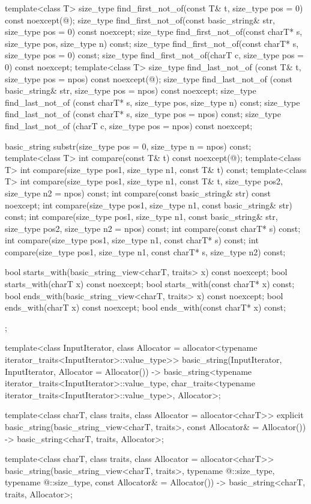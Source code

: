 \begin{codeblock}
{{    template<class T>
      size_type find_first_not_of(const T& t, size_type pos = 0) const noexcept(@\seebelow@);
    size_type find_first_not_of(const basic_string& str, size_type pos = 0) const noexcept;
    size_type find_first_not_of(const charT* s, size_type pos, size_type n) const;
    size_type find_first_not_of(const charT* s, size_type pos = 0) const;
    size_type find_first_not_of(charT c, size_type pos = 0) const noexcept;
    template<class T>
      size_type find_last_not_of (const T& t, size_type pos = npos) const noexcept(@\seebelow@);
    size_type find_last_not_of (const basic_string& str, size_type pos = npos) const noexcept;
    size_type find_last_not_of (const charT* s, size_type pos, size_type n) const;
    size_type find_last_not_of (const charT* s, size_type pos = npos) const;
    size_type find_last_not_of (charT c, size_type pos = npos) const noexcept;

    basic_string substr(size_type pos = 0, size_type n = npos) const;
    template<class T>
      int compare(const T& t) const noexcept(@\seebelow@);
    template<class T>
      int compare(size_type pos1, size_type n1, const T& t) const;
    template<class T>
      int compare(size_type pos1, size_type n1, const T& t,
                  size_type pos2, size_type n2 = npos) const;
    int compare(const basic_string& str) const noexcept;
    int compare(size_type pos1, size_type n1, const basic_string& str) const;
    int compare(size_type pos1, size_type n1, const basic_string& str,
                size_type pos2, size_type n2 = npos) const;
    int compare(const charT* s) const;
    int compare(size_type pos1, size_type n1, const charT* s) const;
    int compare(size_type pos1, size_type n1, const charT* s, size_type n2) const;

    bool starts_with(basic_string_view<charT, traits> x) const noexcept;
    bool starts_with(charT x) const noexcept;
    bool starts_with(const charT* x) const;
    bool ends_with(basic_string_view<charT, traits> x) const noexcept;
    bool ends_with(charT x) const noexcept;
    bool ends_with(const charT* x) const;
  };

  template<class InputIterator,
           class Allocator = allocator<typename iterator_traits<InputIterator>::value_type>>
    basic_string(InputIterator, InputIterator, Allocator = Allocator())
      -> basic_string<typename iterator_traits<InputIterator>::value_type,
                      char_traits<typename iterator_traits<InputIterator>::value_type>,
                      Allocator>;

  template<class charT,
           class traits,
           class Allocator = allocator<charT>>
    explicit basic_string(basic_string_view<charT, traits>, const Allocator& = Allocator())
      -> basic_string<charT, traits, Allocator>;

  template<class charT,
           class traits,
           class Allocator = allocator<charT>>
    basic_string(basic_string_view<charT, traits>,
                 typename @\seebelow@::size_type, typename @\seebelow@::size_type,
                 const Allocator& = Allocator())
      -> basic_string<charT, traits, Allocator>;
}
\end{codeblock}

